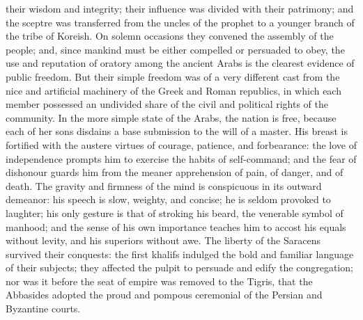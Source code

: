 \documentclass{article}
\begin{document}
their wisdom and integrity; their influence was divided with their patrimony; and the sceptre was transferred from the uncles of the prophet to a younger branch of the tribe of Koreish. On solemn occasions they convened the assembly of the people; and, since mankind must be either compelled or persuaded to obey, the use and reputation of oratory among the ancient Arabs is the clearest evidence of public freedom. But their simple freedom was of a very different cast from the nice and artificial machinery of the Greek and Roman republics, in which each member possessed an undivided share of the civil and political rights of the community. In the more simple state of the Arabs, the nation is free, because each of her sons disdains a base submission to the will of a master. His breast is fortified with the austere virtues of courage, patience, and forbearance: the love of independence prompts him to exercise the habits of self-command; and the fear of dishonour guards him from the meaner apprehension of pain, of danger, and of death. The gravity and firmness of the mind is conspicuous in its outward demeanor: his speech is slow, weighty, and concise; he is seldom provoked to laughter; his only gesture is that of stroking his beard, the venerable symbol of manhood; and the sense of his own importance teaches him to accost his equals without levity, and his superiors without awe. The liberty of the Saracens survived their conquests: the first khalifs indulged the bold and familiar language of their subjects; they affected the pulpit to persuade and edify the congregation; nor was it before the seat of empire was removed to the Tigris, that the Abbasides adopted the proud and pompous ceremonial of the Persian and Byzantine courts.
\end{document}
